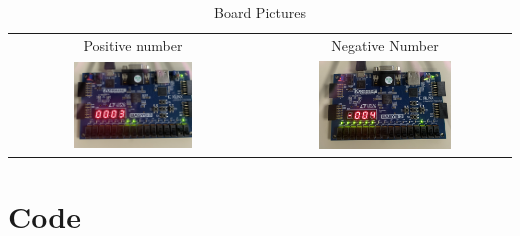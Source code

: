 \documentclass[11pt]{article}
\newcommand{\Verilog}[2][]{%
	
}
\begin{document}
\begin{table}[h]\centering
	\begin{tabular}{cc}
		Positive number & Negative Number \\
		\includegraphics [width=0.5\textwidth,trim=0 0 0 0, clip]{pic2} &
		\includegraphics [width=0.55\textwidth,trim=0 0 0 0, clip]{pic3} \\
	\end{tabular}
	\caption{Board Pictures}
	\label{fig:sim_with_table}
\end{table}



\section*{Code}

\Verilog{Lab10/systemverilog/counter.sv}

\Verilog{Lab10/systemverilog/counter_test.sv}

\Verilog{Lab10/systemverilog/show_2c.sv}

\Verilog{Lab10/systemverilog/show_2c_test.sv}

\Verilog{Lab10/systemverilog/wrapper.sv}

\Verilog{Lab10/systemverilog/top_lab10.sv}
\end{document}

